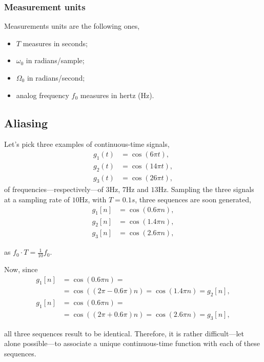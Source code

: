 \documentclass[\documentfontsize, twocolumn]{\classname}
\begin{document}
\subsubsection{Measurement units}

Measurements units are the following ones,
\begin{itemize}
    \item $T$ measures in seconds;
    \item $\omega_0$ in radians/sample;
    \item $\Omega_0$ in radians/second;
    \item analog frequency $f_0$ measures in hertz (Hz).
\end{itemize}

\subsection{Aliasing}

Let's pick three examples of con\-ti\-nuo\-us-time signals,
\begin{align*}
    g_1(t) &= \cos{(6\pi t)}, \\
    g_2(t) &= \cos{(14\pi t)}, \\
    g_3(t) &= \cos{(26\pi t)},
\end{align*}
of frequencies---respectively---of $3$Hz, $7$Hz and $13$Hz. Sampling the three signals at a sampling rate of $10$Hz, with $T=0.1s$, three se\-quen\-ces are soon generated,
\begin{align*}
    g_1[n] &= \cos{(0.6\pi n)}, \\
    g_2[n] &= \cos{(1.4\pi n)}, \\
    g_3[n] &= \cos{(2.6\pi n)},
\end{align*}

as $f_0 \cdot T = \frac{1}{10}f_0$.

Now, since 
\begin{align*}
    g_1[n] &= \cos{(0.6\pi n)} =\\
           &= \cos{((2\pi - 0.6\pi)n)} = \cos{(1.4\pi n)} = g_2[n], \\
    g_1[n] &= \cos{(0.6\pi n)} =\\
           &= \cos{((2\pi + 0.6\pi)n)} = \cos{(2.6\pi n)} = g_3[n],
\end{align*}

all three se\-quen\-ces result to be identical. Therefore, it is rather difficult---let alone possible---to associate a unique con\-ti\-nuo\-us-time function with each of these se\-quen\-ces.
\end{document}
